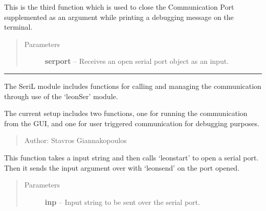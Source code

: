 \documentclass[letterpaper,10pt,english]{sphinxmanual}
\begin{document}

\begin{fulllineitems}
\label{Code:leonSer.leonstop}
This is the third function which is used to close the Communication Port supplemented as an 
argument while printing a debugging message on the terminal.
\begin{quote}\begin{description}
\item[{Parameters}] \leavevmode
\textbf{serport} -- Receives an open serial port object as an input.

\end{description}\end{quote}

\end{fulllineitems}



\bigskip\hrule{}\bigskip

\label{Code:module-SeriL}
The SeriL module includes functions for calling and managing the communication through use of 
the `leonSer' module.

The current setup includes two functions, one for running the communication from the GUI, and one for
user triggered communication for debugging purposes.
\begin{quote}

Author: Stavros Giannakopoulos
\end{quote}

\begin{fulllineitems}
\label{Code:SeriL.GuiLeon}
This function takes a input string and then calls `leonstart' to open a serial port. 
Then it sends the input argument over with `leonsend' on the port opened.
\begin{quote}\begin{description}
\item[{Parameters}] \leavevmode
\textbf{inp} -- Input string to be sent over the serial port.

\end{description}\end{quote}

\end{fulllineitems}

\end{document}
